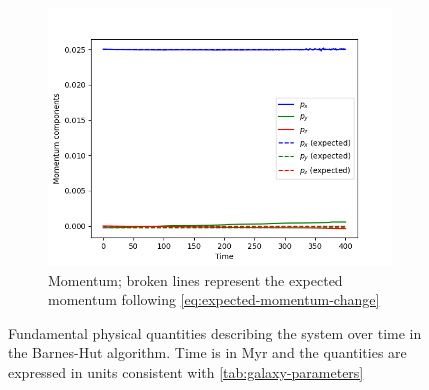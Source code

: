 \begin{figure}[H]
    \vspace{0.2cm}

    \begin{subfigure}[b]{0.5\textwidth}
        \centering
        \includegraphics[width=\textwidth]{chapters/results/img/pm-collision/momentum.png}
        \caption{Momentum; broken lines represent the expected momentum following \autoref{eq:expected-momentum-change}}
        \label{fig:physical-quantities-pm-collision-sub3}
    \end{subfigure}

    \caption{Fundamental physical quantities describing the system over time in the Barnes-Hut algorithm.
        Time is in Myr and the quantities are expressed in units consistent with \autoref{tab:galaxy-parameters}}
    \label{fig:physical-quantities-pm-collision}
\end{figure}

